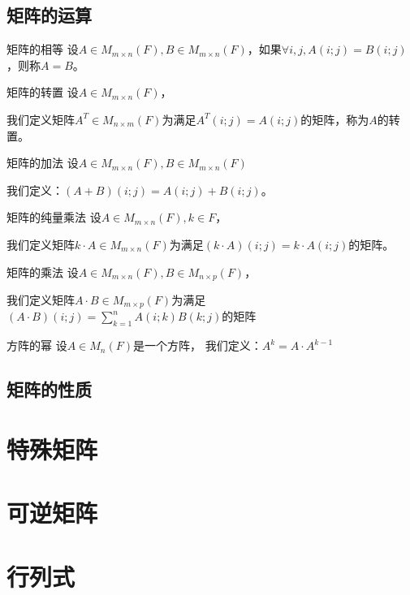 \documentclass[12pt, a4paper, oneside, UTF8]{ctexbook}
\begin{document}
		\subsection{矩阵的运算}
		\begin{para}{0}
			    \begin{defn}{矩阵的相等}{}
				    设$A\in M_{m\times n}(F),B\in M_{m \times n}(F)$，如果$\forall i,j,A(i;j)=B(i;j)$，则称$A=B$。
				\end{defn}
				\begin{defn}{矩阵的转置}{}
				    设$A\in M_{m \times n}(F)$，
					
					我们定义矩阵$A^T \in M_{n \times m}(F)$为满足$A^T(i;j)=A(i;j)$的矩阵，称为$A$的转置。
				\end{defn}
				\begin{defn}{矩阵的加法}{}
				    设$A\in M_{m \times n}(F),B\in M_{m \times n}(F)$
					
					我们定义：$(A+B)(i;j)=A(i;j)+B(i;j)$。
				\end{defn}
				\begin{defn}{矩阵的纯量乘法}{}
				    设$A\in M_{m \times n}(F),k \in F$，
					
					我们定义矩阵$k\cdot A \in M_{m\times n}(F)$为满足$(k\cdot  A)(i;j)=k\cdot A(i;j)$的矩阵。
				\end{defn}
				\begin{defn}{矩阵的乘法}{}
				    设$A\in M_{m\times n}(F),B\in M_{n \times p}(F)$，
					
					我们定义矩阵$A\cdot B \in M_{m\times p}(F)$为满足$(A\cdot B)(i;j)=\sum_{k=1}^n A(i;k)B(k;j)$的矩阵
				\end{defn}
				\begin{defn}{方阵的幂}{}
					设$A \in M_n (F)$是一个方阵，
					我们定义：$A^k=A\cdot A^{k-1}$
				\end{defn}
		\end{para}
		\subsection{矩阵的性质}
	\section{特殊矩阵}
	\section{可逆矩阵}
	\section{行列式}
\end{document}
